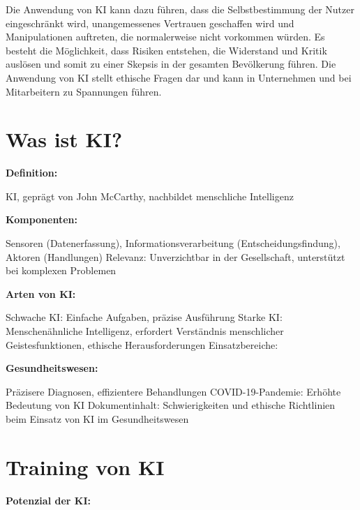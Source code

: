 \documentclass{article}
\begin{document}
\vspace{2mm}Die Anwendung von KI kann dazu führen, dass die Selbstbestimmung der Nutzer eingeschränkt wird, unangemessenes Vertrauen geschaffen wird und Manipulationen auftreten, die normalerweise nicht vorkommen würden. Es besteht die Möglichkeit, dass Risiken entstehen, die Widerstand und Kritik auslösen und somit zu einer Skepsis in der gesamten Bevölkerung führen. Die Anwendung von KI stellt ethische Fragen dar und kann in Unternehmen und bei Mitarbeitern zu Spannungen führen.



\section{Was ist KI?}

\vspace{2mm}\textbf{Definition:}

\vspace{2mm}KI, geprägt von John McCarthy, nachbildet menschliche Intelligenz

\vspace{2mm}\textbf{Komponenten:}

\vspace{2mm}Sensoren (Datenerfassung), Informationsverarbeitung (Entscheidungsfindung), Aktoren (Handlungen)
Relevanz: Unverzichtbar in der Gesellschaft, unterstützt bei komplexen Problemen

\vspace{2mm}\textbf{Arten von KI:}

\vspace{2mm}Schwache KI: Einfache Aufgaben, präzise Ausführung
Starke KI: Menschenähnliche Intelligenz, erfordert Verständnis menschlicher Geistesfunktionen, ethische Herausforderungen
Einsatzbereiche:

\vspace{2mm}\textbf{Gesundheitswesen:}

\vspace{2mm}Präzisere Diagnosen, effizientere Behandlungen
COVID-19-Pandemie: Erhöhte Bedeutung von KI
Dokumentinhalt: Schwierigkeiten und ethische Richtlinien beim Einsatz von KI im Gesundheitswesen

\vspace{23mm}

\section{Training von KI}
\textbf{Potenzial der KI:}
\end{document}
